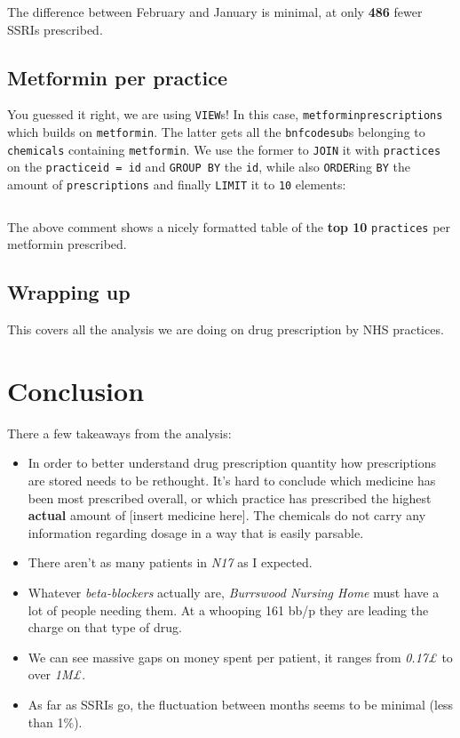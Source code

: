 \documentclass[english,a4paper,]{report}
\begin{document}
\inputminted[firstline=92,lastline=102]{sql}{src/sql/02-queries.sql}

The difference between February and January is minimal, at only
\textbf{486} fewer SSRIs prescribed.

\section{Metformin per practice}\label{metformin-per-practice}

You guessed it right, we are using \texttt{VIEW}s! In this case,
\texttt{metforminprescriptions} which builds on \texttt{metformin}. The
latter gets all the \texttt{bnfcodesub}s belonging to \texttt{chemicals}
containing \texttt{metformin}. We use the former to \texttt{JOIN} it
with \texttt{practices} on the \texttt{practiceid\ =\ id} and
\texttt{GROUP\ BY} the \texttt{id}, while also \texttt{ORDER}ing
\texttt{BY} the amount of \texttt{prescriptions} and finally
\texttt{LIMIT} it to \texttt{10} elements:

\inputminted[firstline=107]{sql}{src/sql/02-queries.sql}

The above comment shows a nicely formatted table of the \textbf{top 10}
\texttt{practices} per metformin prescribed.

\section{Wrapping up}\label{wrapping-up-2}

This covers all the analysis we are doing on drug prescription by NHS
practices.

\chapter{Conclusion}\label{conclusion}

There a few takeaways from the analysis:

\begin{itemize}
\item
  In order to better understand drug prescription quantity how
  prescriptions are stored needs to be rethought. It's hard to conclude
  which medicine has been most prescribed overall, or which practice has
  prescribed the highest \textbf{actual} amount of {[}insert medicine
  here{]}. The chemicals do not carry any information regarding dosage
  in a way that is easily parsable.
\item
  There aren't as many patients in \emph{N17} as I expected.
\item
  Whatever \emph{beta-blockers} actually are, \emph{Burrswood Nursing
  Home} must have a lot of people needing them. At a whooping 161 bb/p
  they are leading the charge on that type of drug.
\item
  We can see massive gaps on money spent per patient, it ranges from
  \emph{0.17£} to over \emph{1M£}.
\item
  As far as SSRIs go, the fluctuation between months seems to be minimal
  (less than 1\%).
\end{itemize}
\end{document}
